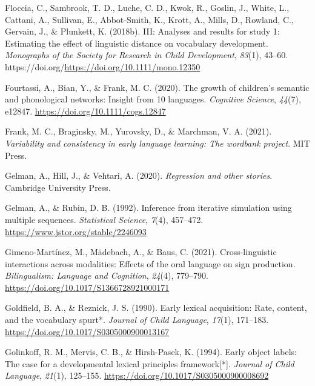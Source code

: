 \documentclass[
  man,
  floatsintext,
  colorlinks=true,linkcolor=blue,citecolor=blue,urlcolor=blue,biblatex]{apa7}
\newlength{\cslhangindent}
\newlength{\cslentryspacingunit} %
\newenvironment{CSLReferences}[2] %
 {%
  \setlength{\parindent}{0pt}
  \ifodd #1
  \let\oldpar\par
  \def\par{\hangindent=\cslhangindent\oldpar}
  \fi
  \setlength{\parskip}{#2\cslentryspacingunit}
 }%
 {}
\begin{document}
\begin{CSLReferences}{1}{0}
\leavevmode{}%
Floccia, C., Sambrook, T. D., Luche, C. D., Kwok, R., Goslin, J., White,
L., Cattani, A., Sullivan, E., Abbot‐Smith, K., Krott, A., Mills, D.,
Rowland, C., Gervain, J., \& Plunkett, K. (2018b). {III}: Analyses and
results for study 1: Estimating the effect of linguistic distance on
vocabulary development. \emph{Monographs of the Society for Research in
Child Development}, \emph{83}(1), 43--60.
https://doi.org/\url{https://doi.org/10.1111/mono.12350}

\leavevmode{}%
Fourtassi, A., Bian, Y., \& Frank, M. C. (2020). The growth of
children's semantic and phonological networks: Insight from 10
languages. \emph{Cognitive Science}, \emph{44}(7), e12847.
\url{https://doi.org/10.1111/cogs.12847}

\leavevmode{}%
Frank, M. C., Braginsky, M., Yurovsky, D., \& Marchman, V. A. (2021).
\emph{Variability and consistency in early language learning: The
wordbank project}. {MIT} Press.

\leavevmode{}%
Gelman, A., Hill, J., \& Vehtari, A. (2020). \emph{Regression and other
stories}. Cambridge University Press.

\leavevmode{}%
Gelman, A., \& Rubin, D. B. (1992). Inference from iterative simulation
using multiple sequences. \emph{Statistical Science}, \emph{7}(4),
457--472. \url{https://www.jstor.org/stable/2246093}

\leavevmode{}%
Gimeno-Martínez, M., Mädebach, A., \& Baus, C. (2021). Cross-linguistic
interactions across modalities: Effects of the oral language on sign
production. \emph{Bilingualism: Language and Cognition}, \emph{24}(4),
779--790. \url{https://doi.org/10.1017/S1366728921000171}

\leavevmode{}%
Goldfield, B. A., \& Reznick, J. S. (1990). Early lexical acquisition:
Rate, content, and the vocabulary spurt*. \emph{Journal of Child
Language}, \emph{17}(1), 171--183.
\url{https://doi.org/10.1017/S0305000900013167}

\leavevmode{}%
Golinkoff, R. M., Mervis, C. B., \& Hirsh-Pasek, K. (1994). Early object
labels: The case for a developmental lexical principles
framework{[}*{]}. \emph{Journal of Child Language}, \emph{21}(1),
125--155. \url{https://doi.org/10.1017/S0305000900008692}


\end{CSLReferences}
\end{document}
